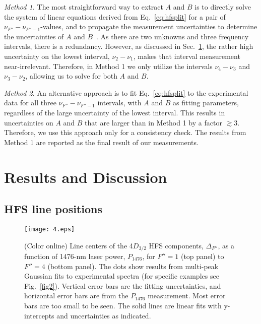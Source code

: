 \documentclass[reprint, amsmath,amssymb, aps, pra, longbibliography]{revtex4-1}
\begin{document}
\textit{Method 1.} The most straightforward way to extract $A$ and $B$ is to directly solve the system of linear equations derived from Eq.~\ref{eq:hfsplit} for a pair of $\nu_{F''}-\nu_{F''-1}$-values, and to propagate the measurement uncertainties to determine the uncertainties of $A$ and $B$~\cite{taylor}. As there are two unknowns and three frequency intervals, there is a redundancy. However, as discussed in Sec.~\ref{sec:res}, the rather high uncertainty on the lowest interval, $\nu_{2} - \nu_1$, makes that interval measurement near-irrelevant. 
Therefore, in Method 1 we only utilize the intervals
$\nu_4 - \nu_3$ and $\nu_3 - \nu_2$, allowing us to solve for both 
$A$ and $B$. 

\textit{Method 2.} An alternative approach is to fit Eq.~\ref{eq:hfsplit} to the experimental data for all three $\nu_{F''} - \nu_{F''-1}$ intervals, with $A$ and $B$ as fitting parameters, regardless of the large uncertainty of the lowest interval. 
This results in uncertainties on $A$ and $B$ that are larger than in Method 1 by a factor $\gtrsim 3$. Therefore, we use this approach only for a consistency check. The results from Method 1 are reported as the final result of our measurements.

\section{Results and Discussion}
\label{sec:res}

\subsection{HFS line positions}
\label{subsec:lines}

\begin{figure}[htb]
 \centering
  \texttt{[image: 4.eps]}
  \caption{(Color online) Line centers of the 4$D_{3/2}$ HFS components, $\Delta_{F''}$, as a function of 1476-nm laser power, $P_{1476}$, 
  for $F''=1$ (top panel) to $F''=4$ (bottom panel). The dots show results from multi-peak Gaussian fits to experimental spectra (for specific examples see Fig.~\ref{fig2}). Vertical error bars are the fitting uncertainties, and horizontal error bars are from the $P_{1476}$ measurement. Most error bars are too small to be seen.
  The solid lines are linear fits with y-intercepts and uncertainties as indicated.} 
  \label{fig4}
\end{figure}
\end{document}

